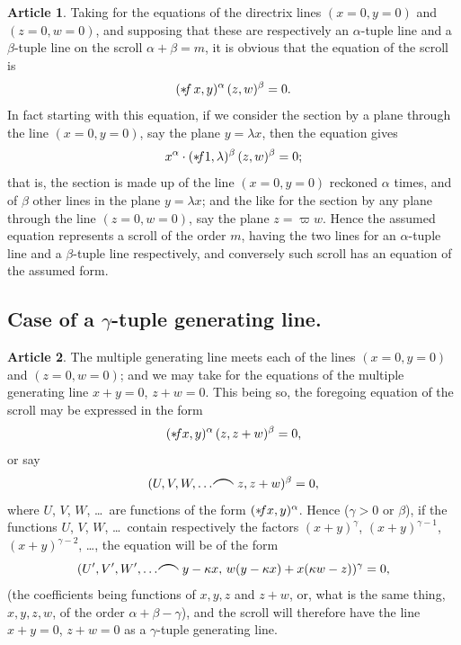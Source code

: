 \documentclass[12pt,a4paper]{article}
\theoremstyle{definition}
\newtheorem{art}{Article}[section]
\begin{document}
\begin{art}
Taking for the equations of the directrix lines $(x = 0, y = 0)$ and $(z = 0, w = 0)$, and supposing that these are respectively an $\alpha$-tuple line and a $\beta$-tuple line on the scroll $\alpha + \beta = m$, it is obvious that the equation of the scroll is
\[
(* \hspace{-2pt} f\,x, y)^\alpha \, (z, w)^\beta = 0.
\]
In fact starting with this equation, if we consider the section by a plane through the line $(x = 0, y = 0)$, say the plane $y = \lambda x$, then the equation gives
\[
x^\alpha \cdot (* \hspace{-2pt} f 1, \lambda)^\beta \, (z, w)^\beta = 0;
\]
that is, the section is made up of the line $(x = 0, y = 0)$ reckoned $\alpha$ times, and of $\beta$ other lines in the plane $y = \lambda x$; and the like for the section by any plane through the line $(z = 0, w = 0)$, say the plane $z = \varpi w$. Hence the assumed equation represents a scroll of the order $m$, having the two lines for an $\alpha$-tuple line and a $\beta$-tuple line respectively, and conversely such scroll has an equation of the assumed form.
\end{art}

\subsection*{Case of a $\gamma$-tuple generating line.}

\begin{art}
The multiple generating line meets each of the lines $(x = 0, y = 0)$ and $(z = 0, w = 0)$; and we may take for the equations of the multiple generating line $x + y = 0$, $z + w = 0$. This being so, the foregoing equation of the scroll may be expressed in the form
\[
(* \hspace{-2pt} fx, y)^\alpha \, (z, z + w)^\beta = 0,
\]
or say
\[
(U, V, W, \ldots \hspace{-2pt} \resizebox{!}{1.5ex}{$\frown$} \hspace{2pt} z, z + w)^\beta = 0,
\]
where $U$, $V$, $W$, \ldots\ are functions of the form $(* \hspace{-2pt} fx, y)^\alpha$. Hence ($\gamma > 0$ or $\beta$), if the functions $U$, $V$, $W$, \ldots\ contain respectively the factors $(x + y)^\gamma$, $(x + y)^{\gamma-1}$, $(x + y)^{\gamma-2}$, \ldots, the equation will be of the form
\[
(U', V', W', \ldots \hspace{-2pt} \resizebox{!}{1.5ex}{$\frown$} \hspace{2pt} y - \kappa x, \, w(y - \kappa x) + x(\kappa w - z))^\gamma = 0,
\]
(the coefficients being functions of $x, y, z$ and $z + w$, or, what is the same thing, $x, y, z, w$, of the order $\alpha + \beta - \gamma$), and the scroll will therefore have the line $x + y = 0$, $z + w = 0$ as a $\gamma$-tuple generating line.
\end{art}
\end{document}
